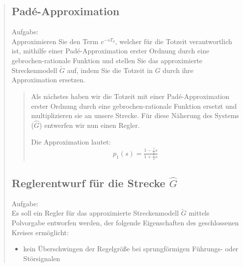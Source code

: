 \begin{quote}
\begin{quote}
    \end{quote}
    
    
    \subsection{Pad\'e-Approximation}
    
    Aufgabe:\\
    Approximieren Sie den Term $e^{-sT_d}$, welcher für die Totzeit verantwortlich ist, mithilfe einer
    Pad\'e-Approximation erster Ordnung durch eine gebrochen-rationale Funktion und stellen Sie das approximierte
    Streckenmodell $\tilde{G}$ auf, indem Sie die Totzeit in $G$ durch ihre Approximation ersetzen. \vspace{1em}
    
    \begin{quote}
        
        Als nächstes haben wir die Totzeit mit einer Pad\'e-Approximation erster Ordnung durch eine gebrochen-rationale
        Funktion ersetzt und multiplizieren sie an unsere Strecke. Für diese Näherung des Systems ($\hat{G}$) entwerfen
        wir nun einen Regler.\vspace{1em}
        
        Die Approximation lautet:
        \begin{equation*}
        	\begin{split}
        		p_1(s) = \frac{1-\frac{\tau}{2}s}{1+\frac{\tau}{2}s}
        	\end{split}
        \end{equation*}
        
    \end{quote}
    
    \subsection{Reglerentwurf für die Strecke $\hat{G}$}
    Aufgabe:\\
    Es soll ein Regler für das approximierte Streckenmodell $\tilde{G}$ mittels Polvorgabe entworfen werden, der
    folgende Eigenschaften des geschlossenen Kreises ermöglicht:
        
        \begin{itemize}
            
            \item kein Überschwingen der Regelgröße bei sprungförmigen Führungs- oder Störsignalen
            

\end{itemize}
\end{quote}
